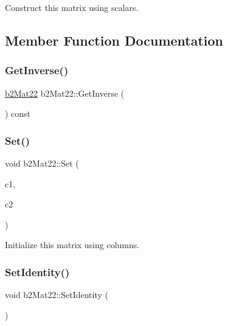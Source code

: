 Construct this matrix using scalars. 



\subsection{Member Function Documentation}
\mbox{\label{structb2_mat22_ad0b0676deea081b761c67be48e0ac850}} 
\subsubsection{\texorpdfstring{GetInverse()}{GetInverse()}}
{\footnotesize\ttfamily \mbox{\hyperlink{structb2_mat22}{b2\+Mat22}} b2\+Mat22\+::\+Get\+Inverse (\begin{DoxyParamCaption}{ }\end{DoxyParamCaption}) const\hspace{0.3cm}{\ttfamily [inline]}}

\mbox{\label{structb2_mat22_aed3bee1de38a0b3f36e21c90faa24112}} 
\subsubsection{\texorpdfstring{Set()}{Set()}}
{\footnotesize\ttfamily void b2\+Mat22\+::\+Set (\begin{DoxyParamCaption}\item[{const \mbox{\hyperlink{structb2_vec2}{b2\+Vec2}} \&}]{c1,  }\item[{const \mbox{\hyperlink{structb2_vec2}{b2\+Vec2}} \&}]{c2 }\end{DoxyParamCaption})\hspace{0.3cm}{\ttfamily [inline]}}



Initialize this matrix using columns. 

\mbox{\label{structb2_mat22_a7192f063b771ac9ded060e41df890509}} 
\subsubsection{\texorpdfstring{SetIdentity()}{SetIdentity()}}
{\footnotesize\ttfamily void b2\+Mat22\+::\+Set\+Identity (\begin{DoxyParamCaption}{ }\end{DoxyParamCaption})\hspace{0.3cm}{\ttfamily [inline]}}



